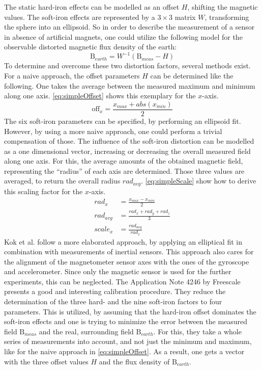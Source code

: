 The static hard-iron effects can be modelled as an offset $ H $, shifting the magnetic values. The soft-iron effects are represented by a $ 3\times3 $ matrix $ W $, transforming the sphere into an ellipsoid. So in order to describe the measurement of a sensor in absence of artificial magnets, one could utilize the following model for the observable distorted magnetic flux density of the earth:
\begin{equation} \label{eq:hardSoftModel}
\mathrm{B}_{earth} = W^{-1} (\mathrm{B}_{meas} - H)
\end{equation}
To determine and overcome these two distortion factors, several methods exist. For a naive approach, the offset parameters $ H $ can be determined like the following. One takes the average between the measured maximum and minimum along one axis. \ref{eq:simpleOffset} shows this exemplary for the $ x $-axis.
\begin{equation} \label{eq:simpleOffset}
\mathrm{off}_{x} = \frac{x_{max} + abs(x_{min})}{2}
\end{equation}
The six soft-iron parameters can be specified, by performing an ellipsoid fit. However, by using a more naive approach, one could perform a trivial compensation of those. The influence of the soft-iron distortion can be modelled as a one dimensional vector, increasing or decreasing the overall measured field along one axis. For this, the average amounts of the obtained magnetic field, representing the  ``radius'' of each axis are determined. Those three values are averaged, to return the overall radius $ rad_{avg} $. \ref{eq:simpleScale} show how to derive this scaling factor for the $ x $-axis.\\
\begin{equation} \label{eq:simpleScale}
\begin{aligned}
rad_{x} &= \frac{x_{max} - x_{min}}{2}\\
rad_{avg} &= \frac{rad_{x} + rad_{y} + rad_{z}}{3}\\
scale_{x} &= \frac{rad_{avg}}{rad_{x}}
\end{aligned}
\end{equation}
Kok et al. \cite{kok2012calibration} follow a more elaborated approach, by applying an elliptical fit in combination with measurements of inertial sensors. This approach also cares for the alignment of the magnetometer sensor axes  with the ones of the gyroscope and accelerometer. Since only the magnetic sensor is used for the further experiments, this can be neglected. The Application Note 4246 by Freescale \cite{ozyagcilar2012calibrating} presents a good and interesting calibration procedure. They reduce the determination of the three hard- and the nine soft-iron factors to four parameters. This is utilized, by assuming that the hard-iron offset dominates the soft-iron effects and one is trying to minimize the error between the measured field $ \mathrm{B}_{meas} $ and the real, surrounding field $ \mathrm{B}_{earth} $. For this, they take a whole series of measurements into account, and not just the minimum and maximum, like for the naive approach in \ref{eq:simpleOffset}. As a result, one gets a vector with the three offset values $ H $ and the flux density of $ \mathrm{B}_{earth} $. 

